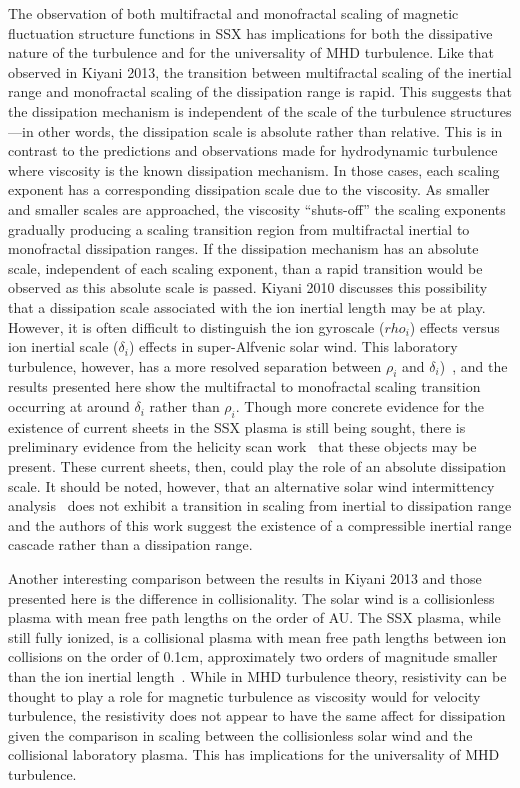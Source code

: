 \documentclass[aps,prl,amsmath,amssymb,reprint,superscriptaddress]{revtex4-1} %
\begin{document}
The observation of both multifractal and monofractal scaling of magnetic fluctuation structure functions in SSX has implications for both the dissipative nature of the turbulence and for the universality of MHD turbulence. Like that observed in Kiyani 2013, the transition between multifractal scaling of the inertial range and monofractal scaling of the dissipation range is rapid. This suggests that the dissipation mechanism is independent of the scale of the turbulence structures---in other words, the dissipation scale is absolute rather than relative. This is in contrast to the predictions and observations made for hydrodynamic turbulence where viscosity is the known dissipation mechanism. In those cases, each scaling exponent has a corresponding dissipation scale due to the viscosity. As smaller and smaller scales are approached, the viscosity ``shuts-off'' the scaling exponents gradually producing a scaling transition region from multifractal inertial to monofractal dissipation ranges. If the dissipation mechanism has an absolute scale, independent of each scaling exponent, than a rapid transition would be observed as this absolute scale is passed. Kiyani 2010 discusses this possibility that a dissipation scale associated with the ion inertial length may be at play. However, it is often difficult to distinguish the ion gyroscale ($rho_i$) effects versus ion inertial scale ($\delta_i$) effects in super-Alfvenic solar wind. This laboratory turbulence, however, has a more resolved separation between $\rho_i$ and $\delta_i$)~\cite{schaffner2014c}, and the results presented here show the multifractal to monofractal scaling transition occurring at around $\delta_i$ rather than $\rho_i$. Though more concrete evidence for the existence of current sheets in the SSX plasma is still being sought, there is preliminary evidence from the helicity scan work~\cite{schaffner2014b} that these objects may be present. These current sheets, then, could play the role of an absolute dissipation scale. It should be noted, however, that an alternative solar wind intermittency analysis~\cite{alexandrova2008} does not exhibit a transition in scaling from inertial to dissipation range and the authors of this work suggest the existence of a compressible inertial range cascade rather than a dissipation range.

Another interesting comparison between the results in Kiyani 2013 and those presented here is the difference in collisionality. The solar wind is a collisionless plasma with mean free path lengths on the order of AU. The SSX plasma, while still fully ionized, is a collisional plasma with mean free path lengths between ion collisions on the order of 0.1cm, approximately two orders of magnitude smaller than the ion inertial length~\cite{schaffner2014c}. While in MHD turbulence theory, resistivity can be thought to play a role for magnetic turbulence as viscosity would for velocity turbulence, the resistivity does not appear to have the same affect for dissipation given the comparison in scaling between the collisionless solar wind and the collisional laboratory plasma. This has implications for the universality of MHD turbulence.
\end{document}
